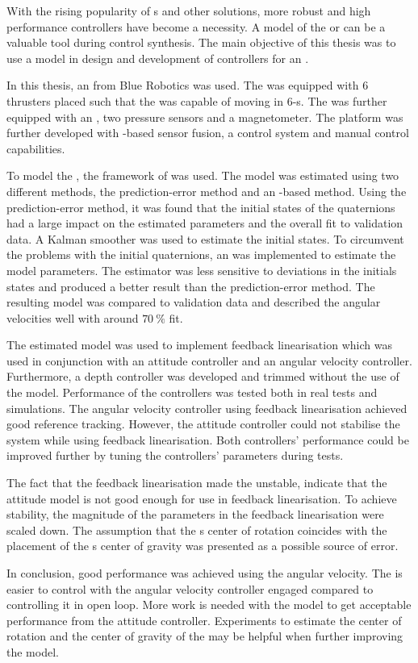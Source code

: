 With the rising popularity of \abbrROV{}s and other \abbrUV solutions, more robust and high performance controllers have become a necessity. A model of the \abbrROV or \abbrUV can be a valuable tool during control synthesis. The main objective of this thesis was to use a model in design and development of controllers for an \abbrROV.

In this thesis, an \abbrROV from Blue Robotics was used. The \abbrROV was equipped with 6 thrusters placed such that the \abbrROV was capable of moving in 6-\abbrDOF{}s. The \abbrROV was further equipped with an \abbrIMU, two pressure sensors and a magnetometer. The \abbrROV platform was further developed with \abbrEKF{}-based sensor fusion, a control system and manual control capabilities.
 
To model the \abbrROV, the framework of \citet{fossen2011} was used. The model was estimated using two different methods, the prediction-error method and an \abbrEKF-based method. Using the prediction-error method, it was found that the initial states of the quaternions had a large impact on the estimated parameters and the overall fit to validation data. A Kalman smoother was used to estimate the initial states. To circumvent the problems with the initial quaternions, an \abbrEKF was implemented to estimate the model parameters. The \abbrEKF estimator was less sensitive to deviations in the initials states and produced a better result than the prediction-error method. The resulting model was compared to validation data and described the angular velocities well with around $70\ \%$ fit.

The estimated model was used to implement feedback linearisation which was used in conjunction with an attitude controller and an angular velocity controller. Furthermore, a depth controller was developed and trimmed without the use of the model.  
Performance of the controllers was tested both in real tests and simulations. The angular velocity controller using feedback linearisation achieved good reference tracking. However, the attitude controller could not stabilise the system while using feedback linearisation. Both controllers' performance could be improved further by tuning the controllers' parameters during tests. 

The fact that the feedback linearisation made the \abbrROV unstable, indicate that the attitude model is not good enough for use in feedback linearisation. To achieve stability, the magnitude of the parameters in the feedback linearisation were scaled down. The assumption that the \abbrROV{}s center of rotation coincides with the placement of the \abbrROV{}s center of gravity was presented as a possible source of error. 

In conclusion, good performance was achieved using the angular velocity. The \abbrROV is easier to control with the angular velocity controller engaged compared to controlling it in open loop. More work is needed with the model to get acceptable performance from the attitude controller. Experiments to estimate the center of rotation and the center of gravity of the \abbrROV may be helpful when further improving the model.
